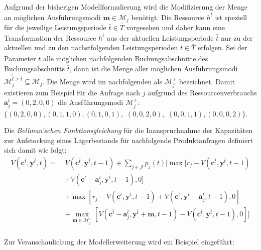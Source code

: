 Aufgrund der bisherigen Modellformulierung wird die Modifizierung der Menge an möglichen Ausführungsmodi $\textbf{m}\in\mathcal{M}_{j}$ benötigt. Die Ressource $h^{\bar{t}}$ ist speziell für die jeweilige Leistungsperiode $\bar{t}\in \bar{T}$ vorgesehen und daher kann eine Transformation der Ressource $h^{\bar{t}}$ aus der aktuellen Leistungsperiode $\hat{t}$ nur zu der aktuellen und zu den nächstfolgenden Leistungsperioden $\bar{t}\in \bar{T}$ erfolgen. Sei der Parameter $\tilde{\bar t}$ alle möglichen nachfolgenden Buchungsabschnitte des Buchungsabschnitts $\bar{t}$, dann ist die Menge aller möglichen Ausführungsmodi $\mathcal{M}_{j}^{\tilde{\bar t}\ge \bar{t}}\subseteq\mathcal{M}_j$. Die Menge wird im nachfolgenden als $\mathcal{M}_{j}^{+}$ bezeichnet. Damit existieren zum Beispiel für die Anfrage nach $j$ aufgrund des Ressourcenverbrauchs $\textbf{a}_{j}^{\bar{t}}=(0,2,0,0)$ die Ausführungsmodi $\mathcal{M}_{j}^{+}$: $\{ (0 ,2, 0, 0), (0, 1, 1, 0), (0, 1, 0, 1),$ $(0, 0, 2, 0),$ $(0, 0, 1, 1), (0, 0, 0, 2)\}$. 

Die \textit{Bellman'schen Funktionsgleichung} für die Inanspruchnahme der Kapazitäten zur Aufstockung eines Lagerbestands für nachfolgende Produktanfragen definiert sich damit wie folgt:
\begin{equation}\label{time}
\begin{alignat*}{2}
V(\textbf{c}^{\bar{t}}, \textbf{y}^{\bar{t}}, t) = \;& V(\textbf{c}^{\bar{t}}, \textbf{y}^{\bar{t}}, t-1)+ \sum_{j \in \mathcal{J}}p_{j}(t)[\max[r_{j} - V(\textbf{c}^{\bar{t}}, \textbf{y}^{\bar{t}}, t-1)\\
&+ V(\textbf{c}^{\bar{t}}-\textbf{a}^{\bar{t}}_j, \textbf{y}^{\bar{t}}, t-1),0] \\
&+ \max[r_{j} - V(\textbf{c}^{\bar{t}}, \textbf{y}^{\bar{t}}, t-1) + V(\textbf{c}^{\bar{t}}, \textbf{y}^{\bar{t}}-\textbf{a}_j^{\bar{t}}, t-1),0]\\
&+ \max_{\textbf{m}\in\mathcal{M}_{j}^{+}}[V(\textbf{c}^{\bar{t}}-\textbf{a}^{\bar{t}}_j, \textbf{y}^{\bar{t}}+\textbf{m}, t-1) - V(\textbf{c}^{\bar{t}}, \textbf{y}^{\bar{t}}, t-1) ,0]]\\
\end{alignat*}
\end{equation}


Zur Veranschaulichung der Modellerweiterung wird ein Beispiel eingeführt:

